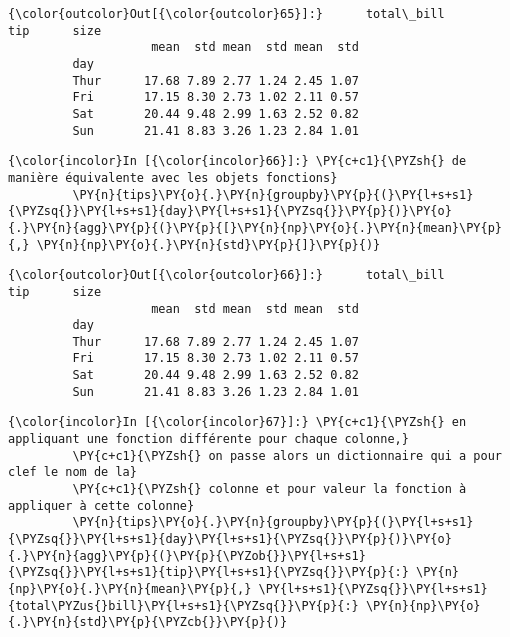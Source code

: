 \begin{Verbatim}[commandchars=\\\{\},frame=single,framerule=0.3mm,rulecolor=\color{cellframecolor}]
{\color{outcolor}Out[{\color{outcolor}65}]:}      total\_bill       tip      size     
                    mean  std mean  std mean  std
         day                                     
         Thur      17.68 7.89 2.77 1.24 2.45 1.07
         Fri       17.15 8.30 2.73 1.02 2.11 0.57
         Sat       20.44 9.48 2.99 1.63 2.52 0.82
         Sun       21.41 8.83 3.26 1.23 2.84 1.01
\end{Verbatim}
            
    \begin{Verbatim}[commandchars=\\\{\},frame=single,framerule=0.3mm,rulecolor=\color{cellframecolor}]
{\color{incolor}In [{\color{incolor}66}]:} \PY{c+c1}{\PYZsh{} de manière équivalente avec les objets fonctions}
         \PY{n}{tips}\PY{o}{.}\PY{n}{groupby}\PY{p}{(}\PY{l+s+s1}{\PYZsq{}}\PY{l+s+s1}{day}\PY{l+s+s1}{\PYZsq{}}\PY{p}{)}\PY{o}{.}\PY{n}{agg}\PY{p}{(}\PY{p}{[}\PY{n}{np}\PY{o}{.}\PY{n}{mean}\PY{p}{,} \PY{n}{np}\PY{o}{.}\PY{n}{std}\PY{p}{]}\PY{p}{)}
\end{Verbatim}


\begin{Verbatim}[commandchars=\\\{\},frame=single,framerule=0.3mm,rulecolor=\color{cellframecolor}]
{\color{outcolor}Out[{\color{outcolor}66}]:}      total\_bill       tip      size     
                    mean  std mean  std mean  std
         day                                     
         Thur      17.68 7.89 2.77 1.24 2.45 1.07
         Fri       17.15 8.30 2.73 1.02 2.11 0.57
         Sat       20.44 9.48 2.99 1.63 2.52 0.82
         Sun       21.41 8.83 3.26 1.23 2.84 1.01
\end{Verbatim}
            
    \begin{Verbatim}[commandchars=\\\{\},frame=single,framerule=0.3mm,rulecolor=\color{cellframecolor}]
{\color{incolor}In [{\color{incolor}67}]:} \PY{c+c1}{\PYZsh{} en appliquant une fonction différente pour chaque colonne,}
         \PY{c+c1}{\PYZsh{} on passe alors un dictionnaire qui a pour clef le nom de la}
         \PY{c+c1}{\PYZsh{} colonne et pour valeur la fonction à appliquer à cette colonne}
         \PY{n}{tips}\PY{o}{.}\PY{n}{groupby}\PY{p}{(}\PY{l+s+s1}{\PYZsq{}}\PY{l+s+s1}{day}\PY{l+s+s1}{\PYZsq{}}\PY{p}{)}\PY{o}{.}\PY{n}{agg}\PY{p}{(}\PY{p}{\PYZob{}}\PY{l+s+s1}{\PYZsq{}}\PY{l+s+s1}{tip}\PY{l+s+s1}{\PYZsq{}}\PY{p}{:} \PY{n}{np}\PY{o}{.}\PY{n}{mean}\PY{p}{,} \PY{l+s+s1}{\PYZsq{}}\PY{l+s+s1}{total\PYZus{}bill}\PY{l+s+s1}{\PYZsq{}}\PY{p}{:} \PY{n}{np}\PY{o}{.}\PY{n}{std}\PY{p}{\PYZcb{}}\PY{p}{)}
\end{Verbatim}


